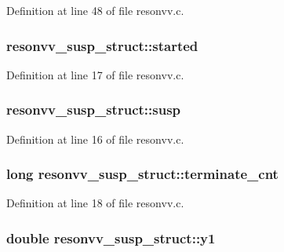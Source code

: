 Definition at line 48 of file resonvv.\+c.

\subsubsection[{\texorpdfstring{started}{started}}]{ resonvv\+\_\+susp\+\_\+struct\+::started}\hypertarget{structresonvv__susp__struct_afd8f76ca24848eb9066c84cd39e46185}{}\label{structresonvv__susp__struct_afd8f76ca24848eb9066c84cd39e46185}


Definition at line 17 of file resonvv.\+c.

\subsubsection[{\texorpdfstring{susp}{susp}}]{ resonvv\+\_\+susp\+\_\+struct\+::susp}\hypertarget{structresonvv__susp__struct_a2be5185ac1dc23f1a67a1ab41aaab85b}{}\label{structresonvv__susp__struct_a2be5185ac1dc23f1a67a1ab41aaab85b}


Definition at line 16 of file resonvv.\+c.

\subsubsection[{\texorpdfstring{terminate\+\_\+cnt}{terminate_cnt}}]{\setlength{\rightskip}{0pt plus 5cm}long resonvv\+\_\+susp\+\_\+struct\+::terminate\+\_\+cnt}\hypertarget{structresonvv__susp__struct_aa141749bb5e93e9a6846e70752ae8a29}{}\label{structresonvv__susp__struct_aa141749bb5e93e9a6846e70752ae8a29}


Definition at line 18 of file resonvv.\+c.

\subsubsection[{\texorpdfstring{y1}{y1}}]{\setlength{\rightskip}{0pt plus 5cm}double resonvv\+\_\+susp\+\_\+struct\+::y1}\hypertarget{structresonvv__susp__struct_a2efea96c37834db1cf1445bcf7a60700}{}\label{structresonvv__susp__struct_a2efea96c37834db1cf1445bcf7a60700}


